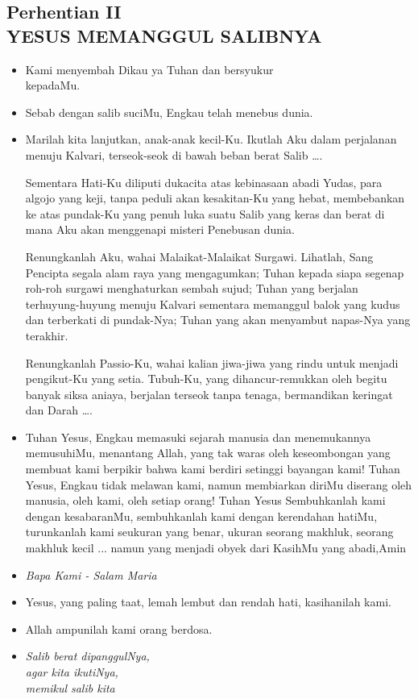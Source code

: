 \documentclass[a5paper,headsepline,titlepage,10pt,nnormalheadings,DIVcalc]{scrbook}
\newcommand{\BU}[1]{\begin{itemize} \item[U:] #1 \end{itemize}}
\newcommand{\BP}[1]{\begin{itemize} \item[P:] #1 \end{itemize}}
\newcommand{\kamiMenyembah}{\BP{ Kami menyembah Dikau ya Tuhan dan bersyukur\\kepadaMu.}
\BU{ Sebab dengan salib suciMu, Engkau telah menebus dunia.}
}
\newcommand{\kasihanilahKami}{\BP{Yesus, yang paling taat, lemah lembut dan rendah hati, kasihanilah kami.}
\BU{Allah ampunilah kami orang berdosa.}}
\begin{document}
\subsection*{Perhentian II\\
YESUS MEMANGGUL SALIBNYA}


\kamiMenyembah
\BP{Marilah kita lanjutkan, anak-anak kecil-Ku. Ikutlah Aku dalam perjalanan menuju Kalvari, terseok-seok di bawah beban berat Salib \dots .

Sementara Hati-Ku diliputi dukacita atas kebinasaan abadi Yudas, para algojo yang keji, tanpa peduli akan kesakitan-Ku yang hebat, membebankan ke atas pundak-Ku yang penuh luka suatu Salib yang keras dan berat di mana Aku akan menggenapi misteri Penebusan dunia.

Renungkanlah Aku, wahai Malaikat-Malaikat Surgawi. Lihatlah, Sang Pencipta segala alam raya yang mengagumkan; Tuhan kepada siapa segenap roh-roh surgawi menghaturkan sembah sujud; Tuhan yang berjalan terhuyung-huyung menuju Kalvari sementara memanggul balok yang kudus dan terberkati di pundak-Nya; Tuhan yang akan menyambut napas-Nya yang terakhir.

Renungkanlah Passio-Ku, wahai kalian jiwa-jiwa yang rindu untuk menjadi pengikut-Ku yang setia. Tubuh-Ku, yang dihancur-remukkan oleh begitu banyak siksa aniaya, berjalan terseok tanpa tenaga, bermandikan keringat dan Darah \dots . }

\BU{Tuhan Yesus, Engkau memasuki sejarah manusia dan menemukannya memusuhiMu, 
menantang Allah, yang tak waras oleh keseombongan yang membuat kami berpikir bahwa kami berdiri setinggi bayangan kami! Tuhan Yesus, Engkau tidak melawan kami, namun membiarkan diriMu diserang oleh manusia, oleh kami, oleh setiap orang! Tuhan Yesus Sembuhkanlah kami dengan kesabaranMu, sembuhkanlah kami dengan kerendahan hatiMu, turunkanlah kami seukuran yang benar, ukuran seorang makhluk, seorang makhluk kecil ... namun yang menjadi obyek dari KasihMu yang abadi,Amin} 



\large\begin{itemize}\item[~]\it{Bapa Kami - Salam Maria}\end{itemize}\normalsize
\kasihanilahKami

\begin{itemize}
\item[3.] \it{Salib berat dipanggulNya,\\ 
	agar kita ikutiNya,\\ 
	memikul salib kita}
\end{itemize}
\end{document}
